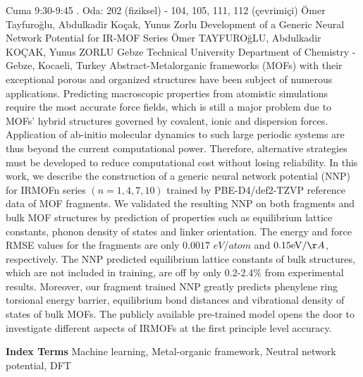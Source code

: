 
    \begin{abstract_basarim}
    {Cuma 9:30-9:45}
    {.}
    {Oda: 202 (fiziksel) - 104, 105, 111, 112 (çevrimiçi)}
    {Ömer Tayfuroğlu, Abdulkadir Koçak, Yunus Zorlu}
    {Development of a Generic Neural Network Potential for IR-MOF Series}
    {%
    Ömer TAYFUROğLU, Abdulkadir KOÇAK, Yunus ZORLU}
    {%
    }
    {%
    Gebze Technical University Department of Chemistry - Gebze, Kocaeli, Turkey}
    Abstract-Metalorganic frameworks (MOFs) with their exceptional porous and organized structures have been subject of numerous applications. Predicting macroscopic properties from atomistic simulations require the most accurate force fields, which is still a major problem due to MOFs' hybrid structures governed by covalent, ionic and dispersion forces. Application of ab-initio molecular dynamics to such large periodic systems are thus beyond the current computational power. Therefore, alternative strategies must be developed to reduce computational cost without losing reliability. In this work, we describe the construction of a generic neural network potential (NNP) for IRMOFn series $(n=1,4,7,10)$ trained by PBE-D4/def2-TZVP reference data of MOF fragments. We validated the resulting NNP on both fragments and bulk MOF structures by prediction of properties such as equilibrium lattice constants, phonon density of states and linker orientation. The energy and force RMSE values for the fragments are only $0.0017$ $e V / a t o m$ and $0.15 \mathrm{eV} / \AA$, respectively. The NNP predicted equilibrium lattice constants of bulk structures, which are not included in training, are off by only 0.2-2.4\% from experimental results. Moreover, our fragment trained NNP greatly predicts phenylene ring torsional energy barrier, equilibrium bond distances and vibrational density of states of bulk MOFs. The publicly available pre-trained model opens the door to investigate different aspects of IRMOFs at the first principle level accuracy. 
    
            \textbf{Index Terms} \newline{}Machine learning, Metal-organic framework, Neutral network potential, DFT
    \end{abstract_basarim}
    